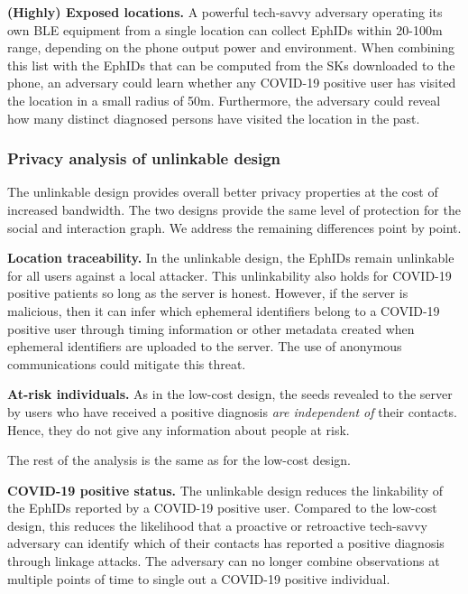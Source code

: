 \documentclass{article}
\begin{document}
\textbf{(Highly) Exposed locations.} A powerful tech-savvy adversary
operating its own BLE equipment from a single location can collect
EphIDs within 20-100m range, depending on the phone output power and
environment. When combining this list with the EphIDs that can be
computed from the SKs downloaded to the phone, an adversary could learn
whether any COVID-19 positive user has visited the location in a small
radius of 50m. Furthermore, the adversary could reveal how many distinct
diagnosed persons have visited the location in the past.

\hypertarget{privacy-analysis-of-unlinkable-design}{%
\subsubsection{Privacy analysis of unlinkable
design}\label{privacy-analysis-of-unlinkable-design}}

The unlinkable design provides overall better privacy properties at the
cost of increased bandwidth. The two designs provide the same level of
protection for the social and interaction graph. We address the
remaining differences point by point.

\textbf{Location traceability.} In the unlinkable design, the EphIDs
remain unlinkable for all users against a local attacker. This
unlinkability also holds for COVID-19 positive patients so long as the
server is honest. However, if the server is malicious, then it can infer
which ephemeral identifiers belong to a COVID-19 positive user through
timing information or other metadata created when ephemeral identifiers
are uploaded to the server. The use of anonymous communications could
mitigate this threat.

\textbf{At-risk individuals.} As in the low-cost design, the seeds
revealed to the server by users who have received a positive diagnosis
\emph{are independent of} their contacts. Hence, they do not give any
information about people at risk.

The rest of the analysis is the same as for the low-cost design.

\textbf{COVID-19 positive status.} The unlinkable design reduces the
linkability of the EphIDs reported by a COVID-19 positive user. Compared
to the low-cost design, this reduces the likelihood that a proactive or
retroactive tech-savvy adversary can identify which of their contacts
has reported a positive diagnosis through linkage attacks. The adversary
can no longer combine observations at multiple points of time to single
out a COVID-19 positive individual.
\end{document}
